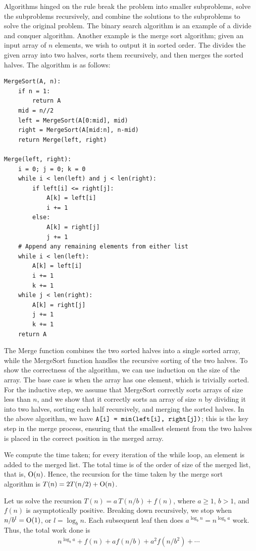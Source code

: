 Algorithms hinged on the  rule break the problem into smaller subproblems, solve the subproblems recursively, and combine the solutions to the subproblems to solve the original problem. The binary search algorithm is an example of a divide and conquer algorithm. Another example is the merge sort algorithm; given an input array of $n$ elements, we wish to output it in sorted order. The  divides the given array into two halves, sorts them recursively, and then merges the sorted halves. The algorithm is as follows:
\begin{verbatim}
MergeSort(A, n):
    if n = 1:
        return A
    mid = n//2
    left = MergeSort(A[0:mid], mid)
    right = MergeSort(A[mid:n], n-mid)
    return Merge(left, right)

Merge(left, right):
    i = 0; j = 0; k = 0
    while i < len(left) and j < len(right):
        if left[i] <= right[j]:
            A[k] = left[i]
            i += 1
        else:
            A[k] = right[j]
            j += 1
    # Append any remaining elements from either list
    while i < len(left):
        A[k] = left[i]
        i += 1
        k += 1
    while j < len(right):
        A[k] = right[j]
        j += 1
        k += 1
    return A
\end{verbatim}
The Merge function combines the two sorted halves into a single sorted array, while the MergeSort function handles the recursive sorting of the two halves. To show the correctness of the algorithm, we can use induction on the size of the array. The base case is when the array has one element, which is trivially sorted. For the inductive step, we assume that MergeSort correctly sorts arrays of size less than $n$, and we show that it correctly sorts an array of size $n$ by dividing it into two halves, sorting each half recursively, and merging the sorted halves. In the above algorithm, we have $\verb|A[i] = min(left[i], right[j])|$; this is the key step in the merge process, ensuring that the smallest element from the two halves is placed in the correct position in the merged array. 

We compute the time taken; for every iteration of the while loop, an element is added to the merged list. The total time is of the order of size of the merged list, that is, $\operatorname{O}(n)$. Hence, the recursion for the time taken by the merge sort algorithm is $T(n) = 2T(n/2)+\operatorname{O}(n)$.

\begin{example}
    Let us solve the recursion $T(n) = a\, T(n/b) + f(n)$, where $a \geq 1$, $b > 1$, and $f(n)$ is asymptotically positive. Breaking down recursively, we stop when $n/b^{l} = \operatorname{O}(1)$, or $l = \log_{b}n$. Each subsequent leaf then does $a^{\log_{b}n} = n^{\log_{b}a}$ work. Thus, the total work done is
    \begin{align}
        n^{\log_{b}a} + f(n) + af(n/b) + a^{2}f(n/b^{2}) + \cdots
    \end{align}
\end{example}

